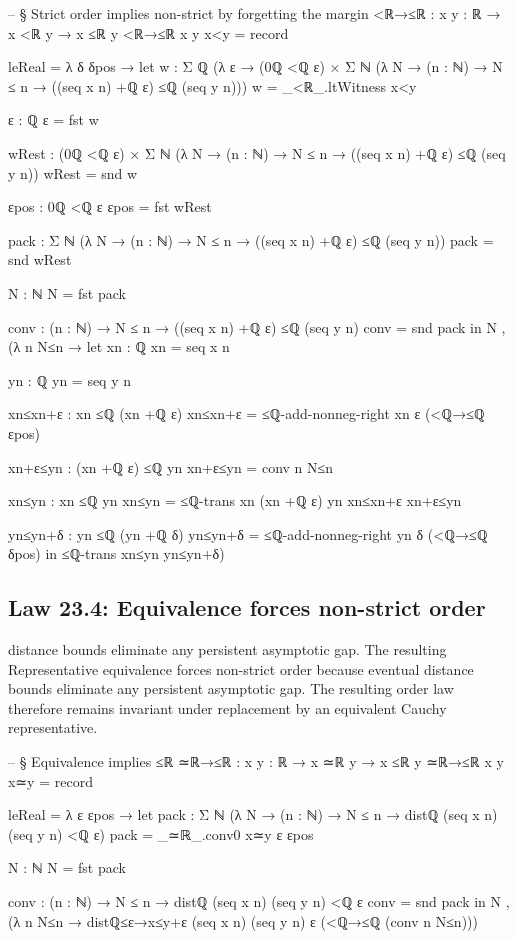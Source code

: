 \documentclass[11pt,a4paper]{book}
\begin{document}
\begin{code}
-- § Strict order implies non-strict by forgetting the margin
<ℝ→≤ℝ : {x y : ℝ} → x <ℝ y → x ≤ℝ y
<ℝ→≤ℝ {x} {y} x<y = record
  { leReal = λ δ δpos →
      let
        w : Σ ℚ (λ ε → (0ℚ <ℚ ε) × Σ ℕ (λ N → (n : ℕ) → N ≤ n → ((seq x n) +ℚ ε) ≤ℚ (seq y n)))
        w = _<ℝ_.ltWitness x<y

        ε : ℚ
        ε = fst w

        wRest : (0ℚ <ℚ ε) × Σ ℕ (λ N → (n : ℕ) → N ≤ n → ((seq x n) +ℚ ε) ≤ℚ (seq y n))
        wRest = snd w

        εpos : 0ℚ <ℚ ε
        εpos = fst wRest

        pack : Σ ℕ (λ N → (n : ℕ) → N ≤ n → ((seq x n) +ℚ ε) ≤ℚ (seq y n))
        pack = snd wRest

        N : ℕ
        N = fst pack

        conv : (n : ℕ) → N ≤ n → ((seq x n) +ℚ ε) ≤ℚ (seq y n)
        conv = snd pack
      in
      N , (λ n N≤n →
        let
          xn : ℚ
          xn = seq x n

          yn : ℚ
          yn = seq y n

          xn≤xn+ε : xn ≤ℚ (xn +ℚ ε)
          xn≤xn+ε = ≤ℚ-add-nonneg-right xn ε (<ℚ→≤ℚ εpos)

          xn+ε≤yn : (xn +ℚ ε) ≤ℚ yn
          xn+ε≤yn = conv n N≤n

          xn≤yn : xn ≤ℚ yn
          xn≤yn = ≤ℚ-trans {xn} {(xn +ℚ ε)} {yn} xn≤xn+ε xn+ε≤yn

          yn≤yn+δ : yn ≤ℚ (yn +ℚ δ)
          yn≤yn+δ = ≤ℚ-add-nonneg-right yn δ (<ℚ→≤ℚ δpos)
        in
        ≤ℚ-trans xn≤yn yn≤yn+δ)
  }
\end{code}

\subsection*{Law 23.4: Equivalence forces non-strict order}

distance bounds eliminate any persistent asymptotic gap. The resulting
Representative equivalence forces non-strict order because eventual distance bounds eliminate any persistent asymptotic gap. The resulting order law therefore remains invariant under replacement by an equivalent Cauchy representative.

\begin{code}
-- § Equivalence implies ≤ℝ
≃ℝ→≤ℝ : {x y : ℝ} → x ≃ℝ y → x ≤ℝ y
≃ℝ→≤ℝ {x} {y} x≃y = record
  { leReal = λ ε εpos →
      let
        pack : Σ ℕ (λ N → (n : ℕ) → N ≤ n → distℚ (seq x n) (seq y n) <ℚ ε)
        pack = _≃ℝ_.conv0 x≃y ε εpos

        N : ℕ
        N = fst pack

        conv : (n : ℕ) → N ≤ n → distℚ (seq x n) (seq y n) <ℚ ε
        conv = snd pack
      in
      N , (λ n N≤n →
        distℚ≤ε→x≤y+ε (seq x n) (seq y n) ε (<ℚ→≤ℚ (conv n N≤n)))
  }
\end{code}
\end{document}
